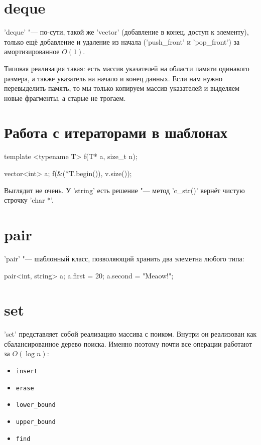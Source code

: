 \section{deque}
\cpp'deque' "--- по-сути, такой же \cpp'vector' (добавление в конец, доступ к элементу), только ещё добавление и удаление из начала
(\cpp'push_front' и \cpp'pop_front') за амортизированное $O(1)$.

Типовая реализация такая: есть массив указателей на области памяти одинакого размера, а также указатель на начало и конец данных.
Если нам нужно перевыделить память, то мы только копируем массив указателей и выделяем новые фрагменты, а старые не трогаем.

\section{Работа с итераторами в шаблонах}

\begin{cppcode}
template <typename T>
f(T* a, size_t n);

vector<int> a;
f(&(*T.begin()), v.size());
\end{cppcode}

Выглядит не очень. У \cpp'string' есть решение "--- метод \cpp'c_str()' вернёт чистую строчку \cpp'char *'.

\section{pair}
\cpp'pair' "--- шаблонный класс, позволяющий хранить два элеметна любого типа:
\begin{cppcode}
pair<int, string> a;
a.first = 20;
a.second = "Meaow!";
\end{cppcode}

\section{set}
\cpp'set' представляет собой реализацию массива с поиком.
Внутри он реализован как сбалансированное дерево поиска.
Именно поэтому почти все операции работают за $O(\log n)$:
\begin{itemize}
	\item \verb'insert'
	\item \verb'erase'
	\item \verb'lower_bound'
	\item \verb'upper_bound'
	\item \verb'find'
\end{itemize}

